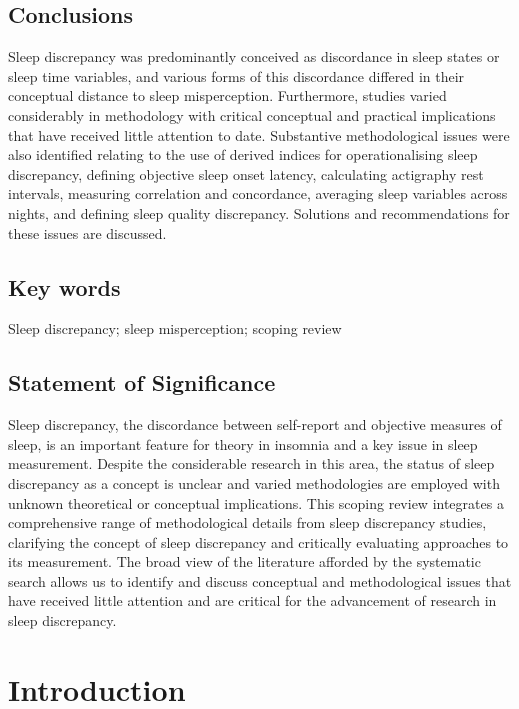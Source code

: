 \documentclass[
]{article}
\begin{document}
\subsection{Conclusions}\label{conclusions}

Sleep discrepancy was predominantly conceived as discordance in sleep states or sleep time variables, and various forms of this discordance differed in their conceptual distance to sleep misperception. Furthermore, studies varied considerably in methodology with critical conceptual and practical implications that have received little attention to date. Substantive methodological issues were also identified relating to the use of derived indices for operationalising sleep discrepancy, defining objective sleep onset latency, calculating actigraphy rest intervals, measuring correlation and concordance, averaging sleep variables across nights, and defining sleep quality discrepancy. Solutions and recommendations for these issues are discussed.

\subsection{Key words}\label{key-words}

Sleep discrepancy; sleep misperception; scoping review

\subsection{Statement of Significance}\label{statement-of-significance}

Sleep discrepancy, the discordance between self-report and objective measures of sleep, is an important feature for theory in insomnia and a key issue in sleep measurement. Despite the considerable research in this area, the status of sleep discrepancy as a concept is unclear and varied methodologies are employed with unknown theoretical or conceptual implications. This scoping review integrates a comprehensive range of methodological details from sleep discrepancy studies, clarifying the concept of sleep discrepancy and critically evaluating approaches to its measurement. The broad view of the literature afforded by the systematic search allows us to identify and discuss conceptual and methodological issues that have received little attention and are critical for the advancement of research in sleep discrepancy.

\section{Introduction}\label{introduction}
\end{document}
